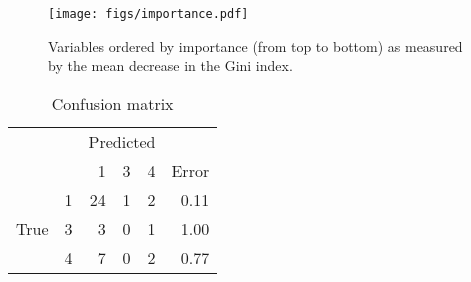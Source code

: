 \begin{figure}
\begin{center}
\texttt{[image: figs/importance.pdf]}
\caption{Variables ordered by importance (from top to bottom) as measured by the mean decrease in the Gini index.}
\label{import}
\end{center}
\end{figure}

\begin{table}
\begin{center}
\begin{tabular}{lr|rrr|r}
     & \multicolumn{1}{l}{}   & \multicolumn{3}{l}{Predicted} \\
     &    &  1 & 3 & 4 & Error \\ \cline{2-6}
     & 1  & 24 & 1 & 2 & 0.11 \\
True & 3  &  3 & 0 & 1 & 1.00 \\
     & 4  &  7 & 0 & 2 & 0.77 \\
\end{tabular}
\caption{Confusion matrix}
\end{center}
\end{table}
